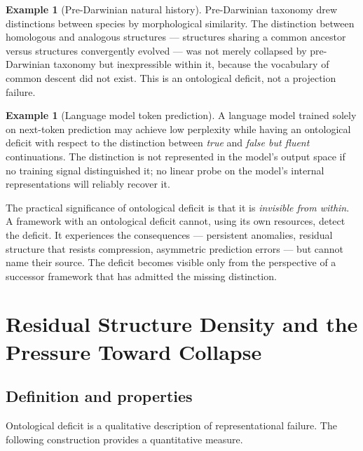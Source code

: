 \documentclass[11pt, a4paper]{article}
\theoremstyle{plain}
\theoremstyle{definition}
\newtheorem{example}[theorem]{Example}
\theoremstyle{remark}
\begin{document}
\begin{example}[Pre-Darwinian natural history]
Pre-Darwinian taxonomy drew distinctions between species by
morphological similarity. The distinction between homologous and
analogous structures --- structures sharing a common ancestor
versus structures convergently evolved --- was not merely collapsed
by pre-Darwinian taxonomy but inexpressible within it, because
the vocabulary of common descent did not exist.
This is an ontological deficit, not a projection failure.
\end{example}

\begin{example}[Language model token prediction]
A language model trained solely on next-token prediction may
achieve low perplexity while having an ontological deficit with
respect to the distinction between \emph{true} and \emph{false
but fluent} continuations. The distinction is not represented
in the model's output space if no training signal distinguished
it; no linear probe on the model's internal representations
will reliably recover it.
\end{example}

The practical significance of ontological deficit is that it is
\emph{invisible from within}. A framework with an ontological
deficit cannot, using its own resources, detect the deficit.
It experiences the consequences --- persistent anomalies, residual
structure that resists compression, asymmetric prediction errors ---
but cannot name their source. The deficit becomes visible only
from the perspective of a successor framework that has admitted
the missing distinction.

\section{Residual Structure Density and the Pressure Toward Collapse}
\label{sec:phi}

\subsection{Definition and properties}

Ontological deficit is a qualitative description of representational
failure. The following construction provides a quantitative measure.
\end{document}
